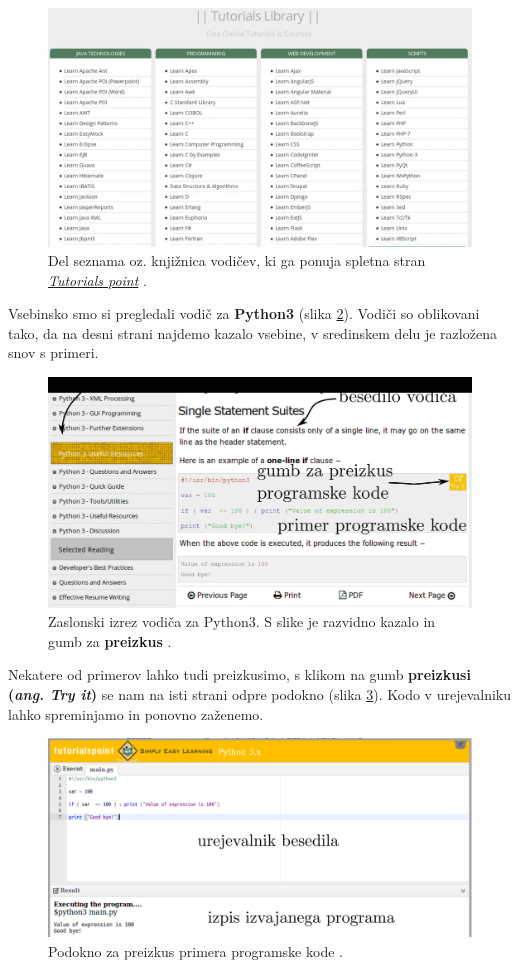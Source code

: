 \begin{figure}[h!]
  \centering
    \includegraphics [width=0.65\linewidth, keepaspectratio =
   1] {./images/sc_web/tutpoint_lib-v01.jpg}
   \caption{Del seznama oz. knjižnica vodičev, ki ga ponuja spletna
     stran \emph{\href{http://www.tutorialspoint.com/}{Tutorials
         point}} \cite{web:tutorialspoint}.}
    \label{fig:web:tutpoint:lib}
\end{figure}

Vsebinsko smo si pregledali vodič za \textbf{Python3} (slika
\ref{fig:web:tutpoint:tut01}). Vodiči so oblikovani tako, da na desni
strani najdemo kazalo vsebine, v sredinskem delu je razložena snov s
primeri.

\begin{figure}[h!]
  \centering
    \includegraphics [width=0.65\linewidth, keepaspectratio =
   1] {./images/sc_web/tutpoint_tutP3-v01.jpg}
   \caption{Zaslonski izrez vodiča za Python3. S slike je razvidno
     kazalo in gumb za \textbf{preizkus} \cite{web:tutorialspoint}.}
    \label{fig:web:tutpoint:tut01}
\end{figure}

Nekatere od primerov lahko tudi preizkusimo, s klikom na gumb
\textbf{preizkusi (\emph{ang. Try it})} se nam na isti strani odpre
podokno (slika \ref{fig:web:tutpoint:tut02}). Kodo v urejevalniku
lahko spreminjamo in ponovno zaženemo.

\begin{figure}[h!]
  \centering
    \includegraphics [width=0.65\linewidth, keepaspectratio =
   1] {./images/sc_web/tutpoint_tutP3-v02.jpg}
   \caption{Podokno za preizkus primera programske kode
     \cite{web:tutorialspoint}.}
    \label{fig:web:tutpoint:tut02}
\end{figure}


